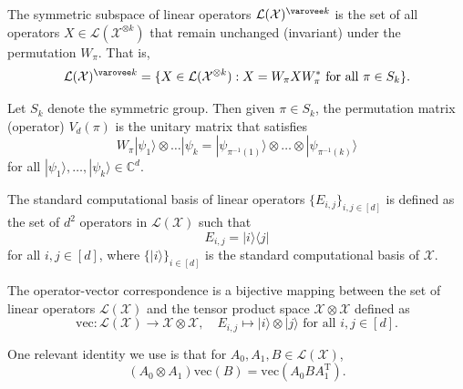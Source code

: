\begin{definition}\label{def:SymmetricLinearOperator}
  The {symmetric subspace of linear operators} $\mathcal{L}(\mathcal{X})^{\varovee k}$ is the set of all operators $X \in \mathcal{L}(\mathcal{X}^{\otimes k})$ that remain unchanged (invariant) under the permutation $W_{\pi}$.
That is,
\begin{equation}\label{eq:SymmetricLinearOperator}
    \mathcal{L}(\mathcal{X})^{\varovee k} = \{X \in \mathcal{L}(\mathcal{X}^{\otimes k}) : X = W_{\pi} X W_{\pi}^{*} \text{ for all } \pi \in S_{k} \}.
\end{equation}

\end{definition}

\begin{remark}
Let $S_k$ denote the symmetric group. Then given $\pi \in S_k$, the permutation matrix (operator) $V_d(\pi)$ is the unitary matrix that satisfies
\begin{equation}\label{eq:permutation}
    W_{\pi} |\psi_1 \rangle \otimes \dots |\psi_k = |\psi_{\pi^{-1}(1)}\rangle \otimes \dots \otimes |\psi_{\pi^{-1}(k)}\rangle
\end{equation}
for all $|\psi_1 \rangle, \dots, |\psi_k\rangle \in \mathbb{C}^{d}$.
\end{remark}

\begin{definition}\label{def:StandardBasisLk}
  The {standard computational basis of linear operators} $\{E_{i, j}\}_{i, j \in [d]}$ is defined as the set of $d^2$ operators in $\mathcal{L}(\mathcal{X})$ such that
\begin{equation}
    E_{i, j} = |i \rangle \langle j|
\end{equation}
for all $i, j \in [d]$, where $\{|i\rangle\}_{i \in [d]}$ is the standard computational basis of $\mathcal{X}$.
\end{definition}

\begin{definition}\label{def:OperatorVectorCorrespondence}
    The {operator-vector correspondence} is a bijective mapping between the set of linear operators $\mathcal{L}(\mathcal{X})$ and the tensor product space $\mathcal{X} \otimes \mathcal{X}$ defined as
    \begin{equation}
    \text{vec} : \mathcal{L}(\mathcal{X}) \to \mathcal{X} \otimes \mathcal{X}, \quad E_{i, j} \mapsto |i\rangle \otimes |j\rangle\text{ for all } i, j \in [d].
    \end{equation}

    One relevant identity we use is that for $A_0, A_1, B \in \mathcal{L}(\mathcal{X})$,
    \begin{equation}\label{eq:OperatorVectorDistribution}
        (A_0 \otimes A_1) \text{vec}(B) = \text{vec}(A_0 B A_1^{\mathrm{T}}).
    \end{equation}
\end{definition}

